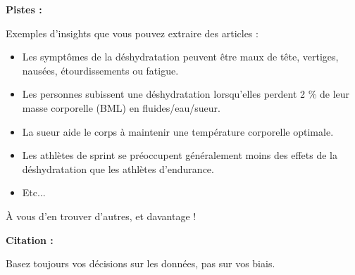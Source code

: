 \textbf{Pistes :}

Exemples d'insights que vous pouvez extraire des articles :

\begin{itemize}
\item Les symptômes de la déshydratation peuvent être maux de tête, vertiges, nausées, étourdissements ou fatigue.
\item Les personnes subissent une déshydratation lorsqu'elles perdent 2 \% de leur masse corporelle (BML) en fluides/eau/sueur.
\item La sueur aide le corps à maintenir une température corporelle optimale.
\item Les athlètes de sprint se préoccupent généralement moins des effets de la déshydratation que les athlètes d'endurance.
\item Etc...
\end{itemize}

À vous d'en trouver d'autres, et davantage !

\textbf{Citation :}

Basez toujours vos décisions sur les données, pas sur vos biais.

